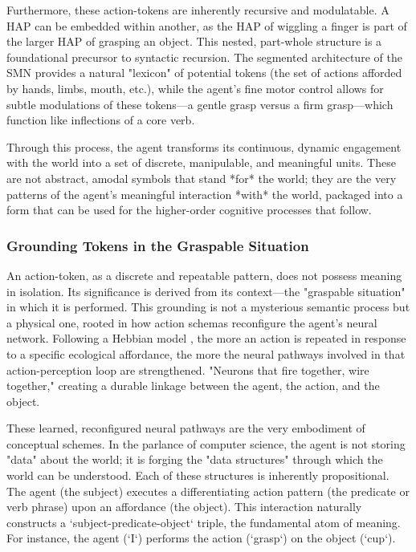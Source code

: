Furthermore, these action-tokens are inherently recursive and modulatable. A HAP can be embedded within another, as the HAP of wiggling a finger is part of the larger HAP of grasping an object. This nested, part-whole structure is a foundational precursor to syntactic recursion. The segmented architecture of the SMN provides a natural "lexicon" of potential tokens (the set of actions afforded by hands, limbs, mouth, etc.), while the agent's fine motor control allows for subtle modulations of these tokens—a gentle grasp versus a firm grasp—which function like inflections of a core verb.

Through this process, the agent transforms its continuous, dynamic engagement with the world into a set of discrete, manipulable, and meaningful units. These are not abstract, amodal symbols that stand *for* the world; they are the very patterns of the agent's meaningful interaction *with* the world, packaged into a form that can be used for the higher-order cognitive processes that follow.

\subsubsection{Grounding Tokens in the Graspable Situation}
\label{ssubsec:grounding}
An action-token, as a discrete and repeatable pattern, does not possess meaning in isolation. Its significance is derived from its context—the "graspable situation" in which it is performed. This grounding is not a mysterious semantic process but a physical one, rooted in how action schemas reconfigure the agent's neural network. Following a Hebbian model \cite{hebb1949organization}, the more an action is repeated in response to a specific ecological affordance, the more the neural pathways involved in that action-perception loop are strengthened. "Neurons that fire together, wire together," creating a durable linkage between the agent, the action, and the object.

These learned, reconfigured neural pathways are the very embodiment of conceptual schemes. In the parlance of computer science, the agent is not storing "data" about the world; it is forging the "data structures" through which the world can be understood. Each of these structures is inherently propositional. The agent (the subject) executes a differentiating action pattern (the predicate or verb phrase) upon an affordance (the object). This interaction naturally constructs a `subject-predicate-object` triple, the fundamental atom of meaning. For instance, the agent (`I`) performs the action (`grasp`) on the object (`cup`).

